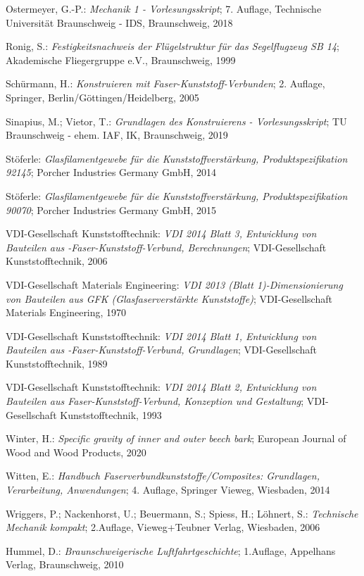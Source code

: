 \begin{thebibliography}{99}
	Ostermeyer, G.-P.:
	\textit{\glqq Mechanik 1 - Vorlesungsskript\grqq};
	7. Auflage, Technische Universität Braunschweig - IDS, Braunschweig, 2018 
	
	Ronig, S.:
	\textit{\glqq Festigkeitsnachweis der Flügelstruktur für das Segelflugzeug SB 14\grqq};
	Akademische Fliegergruppe e.V., Braunschweig, 1999 
	
	Schürmann, H.:
	\textit{\glqq Konstruieren mit Faser-Kunststoff-Verbunden\grqq};
	2. Auflage, Springer, Berlin/Göttingen/Heidelberg, 2005 
	
	Sinapius, M.; Vietor, T.:
	\textit{\glqq Grundlagen des Konstruierens - Vorlesungsskript\grqq};
	TU Braunschweig - ehem. IAF, IK, Braunschweig, 2019
	
	Stöferle:
	\textit{\glqq Glasfilamentgewebe für die Kunststoffverstärkung, Produktspezifikation 92145\grqq};
	Porcher Industries Germany GmbH, 2014
	
	Stöferle:
	\textit{\glqq Glasfilamentgewebe für die Kunststoffverstärkung, Produktspezifikation 90070\grqq};
	Porcher Industries Germany GmbH, 2015
	
	VDI-Gesellschaft Kunststofftechnik:
	\textit{\glqq VDI 2014 Blatt 3, Entwicklung von Bauteilen aus -Faser-Kunststoff-Verbund, Berechnungen\grqq};
	VDI-Gesellschaft Kunststofftechnik, 2006
	
	VDI-Gesellschaft Materials Engineering:
	\textit{\glqq VDI 2013 (Blatt 1)-Dimensionierung von Bauteilen aus GFK (Glasfaserverstärkte Kunststoffe)\grqq};
	VDI-Gesellschaft Materials Engineering, 1970
	
	VDI-Gesellschaft Kunststofftechnik:
	\textit{\glqq VDI 2014 Blatt 1, Entwicklung von Bauteilen aus -Faser-Kunststoff-Verbund, Grundlagen\grqq};
	VDI-Gesellschaft Kunststofftechnik, 1989

	VDI-Gesellschaft Kunststofftechnik:
	\textit{\glqq VDI 2014 Blatt 2, Entwicklung von Bauteilen aus Faser-Kunststoff-Verbund, Konzeption und Gestaltung\grqq};
	VDI-Gesellschaft Kunststofftechnik, 1993 
	
	Winter, H.:
	\textit{\glqq Specific gravity of inner and outer beech bark\grqq};
	European Journal of Wood and Wood Products, 2020
	
	Witten, E.:
	\textit{\glqq Handbuch Faserverbundkunststoffe/Composites: Grundlagen, Verarbeitung, Anwendungen\grqq};
	4. Auflage, Springer Vieweg, Wiesbaden, 2014 
	
	Wriggers, P.; Nackenhorst, U.; Beuermann, S.; Spiess, H.; Löhnert, S.:
	\textit{\glqq Technische Mechanik kompakt\grqq};
	2.Auflage, Vieweg+Teubner Verlag, Wiesbaden, 2006
	
	Hummel, D.:
	\textit{\glqq Braunschweigerische Luftfahrtgeschichte\grqq};
	1.Auflage, Appelhans Verlag, Braunschweig, 2010
	
\end{thebibliography}
\endgroup